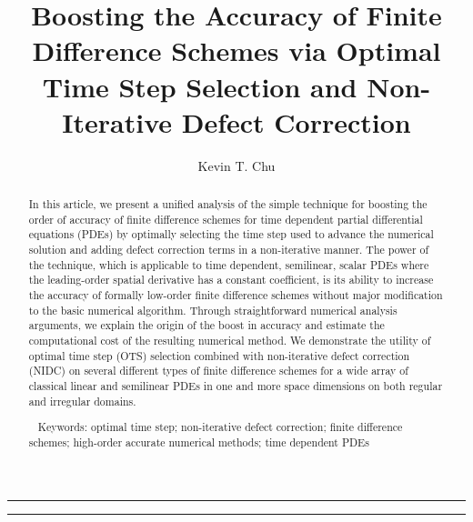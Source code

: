 \documentclass[fleqn,12pt,twoside]{article}
\begin{document}


\title{Boosting the Accuracy of Finite Difference Schemes via Optimal Time
Step Selection and Non-Iterative Defect Correction}

\author{Kevin T. Chu\address{Serendipity Research, Mountain View, CA 94041, United States}
}


\maketitle

\noindent \rule{6.3in}{1pt}

\begin{abstract}
In this article, we present a unified analysis of the simple technique for
boosting the order of accuracy of finite difference schemes for time dependent
partial differential equations (PDEs) by optimally selecting the time step
used to advance the numerical solution and adding defect correction terms in a
non-iterative manner.
The power of the technique, which is applicable to time dependent, semilinear,
scalar PDEs where the leading-order spatial derivative has a constant
coefficient, is its ability to increase the accuracy of formally
low-order finite difference schemes without major modification to the basic 
numerical algorithm.  Through straightforward numerical analysis arguments, we
explain the origin of the boost in accuracy and estimate the computational cost
of the resulting numerical method.  We demonstrate the utility of optimal time
step (OTS) selection combined with non-iterative defect correction (NIDC) on
several different types of finite difference schemes for a wide array of
classical linear and semilinear PDEs in one and more space dimensions on both
regular and irregular domains.

\ \newline
Keywords: optimal time step; non-iterative defect correction; finite difference
schemes; high-order accurate numerical methods; time dependent PDEs

\end{abstract}

\noindent \rule{6.3in}{1pt}
\end{document}
